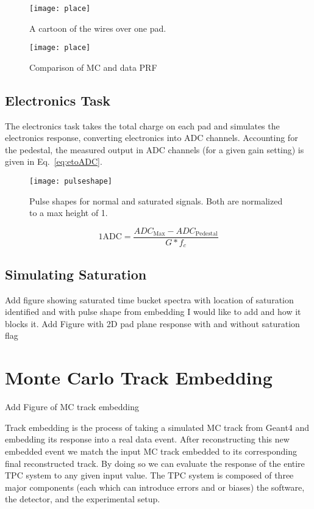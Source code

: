 \begin{figure}
\texttt{[image: place]}
\caption{A cartoon of the wires over one pad. }
\label{fig:onepad}
\end{figure}

\begin{figure}
\texttt{[image: place]}
\caption{Comparison of MC and data PRF}
\label{fig:mcdataPRF}
\end{figure}

\subsection{Electronics Task}
The electronics task takes the total charge on each pad and simulates the electronics response, converting electronics into ADC channels. Accounting for the pedestal, the measured output in ADC channels (for a given gain setting) is given in Eq.~\ref{eq:etoADC}.


\begin{figure}[!hbt]
\texttt{[image: pulseshape]}
\caption{Pulse shapes for normal and saturated signals. Both are normalized to a max height of 1.}
\label{fig:pulseshape}
\end{figure}


\begin{equation}
\mathrm{1 ADC }= \frac{ADC_{\mathrm{Max}} - ADC_{\mathrm{Pedestal}}}{G*f_c}
\label{eq:etoADC}
\end{equation}

\subsection{Simulating Saturation}
Add figure showing saturated time bucket spectra with location of saturation identified and with pulse shape from embedding I would like to add and how it blocks it.
Add Figure with 2D pad plane response with and without saturation flag


\section{Monte Carlo Track Embedding}
Add Figure of MC track embedding 



Track embedding is the process of taking a simulated MC track from Geant4 and embedding its response into a real data event. After reconstructing this new embedded event we match the input MC track embedded to its corresponding final reconstructed track.  By doing so we can evaluate the response of the entire TPC system to any given input value. The TPC system is composed of three major components (each which can introduce errors and or biases) the software, the detector, and the experimental setup.  

